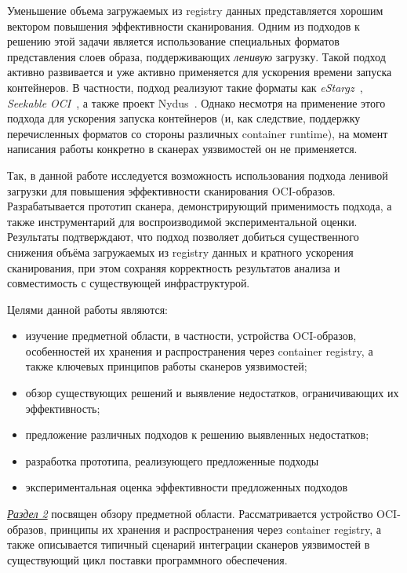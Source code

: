 Уменьшение объема загружаемых из registry данных представляется хорошим вектором повышения эффективности сканирования. Одним из подходов к решению этой задачи является использование специальных форматов представления слоев образа, поддерживающих \textit{ленивую} загрузку. Такой подход активно развивается и уже активно применяется для ускорения времени запуска контейнеров. В частности, подход реализуют такие форматы как \textit{eStargz}~\cite{estargzspec}, \textit{Seekable OCI}~\cite{soci}, а также проект Nydus~\cite{nydus}. Однако несмотря на применение этого подхода для ускорения запуска контейнеров (и, как следствие, поддержку перечисленных форматов со стороны различных container runtime), на момент написания работы конкретно в сканерах уязвимостей он не применяется.

Так, в данной работе исследуется возможность использования подхода ленивой загрузки для повышения эффективности сканирования OCI-образов. Разрабатывается прототип сканера, демонстрирующий применимость подхода, а также инструментарий для воспроизводимой экспериментальной оценки. Результаты подтверждают, что подход позволяет добиться существенного снижения объёма загружаемых из registry данных и кратного ускорения сканирования, при этом сохраняя корректность результатов анализа и совместимость с существующей инфраструктурой.

Целями данной работы являются:
\begin{itemize}
\item изучение предметной области, в частности, устройства OCI-образов, особенностей их хранения и распространения через container registry, а также ключевых принципов работы сканеров уязвимостей;
\item обзор существующих решений и выявление недостатков, ограничивающих их эффективность;
\item предложение различных подходов к решению выявленных недостатков;
\item разработка прототипа, реализующего предложенные подходы
\item экспериментальная оценка эффективности предложенных подходов
\end{itemize}

\hyperref[sec:Chapter1]{\textit{Раздел 2}} посвящен обзору предметной области. Рассматривается устройство OCI-образов, принципы их хранения и распространения через container registry, а также описывается типичный сценарий интеграции сканеров уязвимостей в существующий цикл поставки программного обеспечения.

